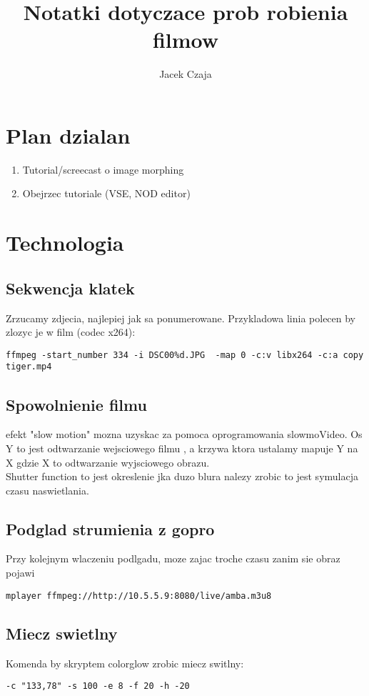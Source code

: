 \documentclass[a4paper,10pt]{article}
\title{Notatki dotyczace prob robienia filmow}
\author{Jacek Czaja}
\begin{document}
\maketitle

\tableofcontents

\section{Plan dzialan}
\begin{enumerate}
\item Tutorial/screecast o image morphing
\item Obejrzec tutoriale (VSE, NOD editor)
\end{enumerate}


\section{Technologia}
\subsection{Sekwencja klatek}
Zrzucamy zdjecia, najlepiej jak sa ponumerowane. Przykladowa linia polecen by zlozyc je w film (codec x264):
\begin{verbatim}
ffmpeg -start_number 334 -i DSC00%d.JPG  -map 0 -c:v libx264 -c:a copy tiger.mp4
\end{verbatim}

\subsection{Spowolnienie filmu}
efekt "slow motion" mozna uzyskac za pomoca oprogramowania slowmoVideo.
Os Y to jest odtwarzanie wejsciowego filmu , a krzywa ktora ustalamy mapuje Y na X gdzie X to
odtwarzanie wyjsciowego obrazu.\\
Shutter function to jest okreslenie jka duzo blura nalezy zrobic to jest symulacja czasu naswietlania. 

\subsection{Podglad strumienia z gopro}
Przy kolejnym wlaczeniu podlgadu, moze zajac troche czasu zanim sie obraz pojawi
\begin{verbatim}
mplayer ffmpeg://http://10.5.5.9:8080/live/amba.m3u8
\end{verbatim}

\subsection{Miecz swietlny}
Komenda by skryptem colorglow zrobic miecz switlny:
\begin{verbatim}
-c "133,78" -s 100 -e 8 -f 20 -h -20
\end{verbatim}
\end{document}
